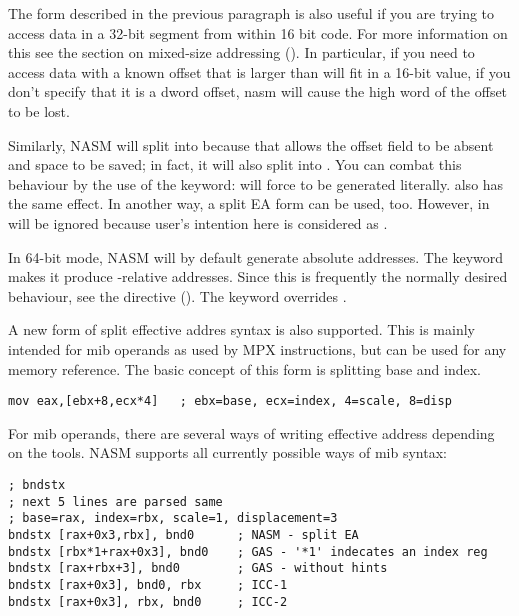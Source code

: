 The form described in the previous paragraph is also useful if you
are trying to access data in a 32-bit segment from within 16 bit code.
For more information on this see the section on mixed-size addressing
(). In particular, if you need to access data with
a known offset that is larger than will fit in a 16-bit value, if you don't
specify that it is a dword offset, nasm will cause the high word of
the offset to be lost.

Similarly, NASM will split \code{[eax*2]} into  because
that allows the offset field to be absent and space to be saved; in fact,
it will also split  into .
You can combat this behaviour by the use of the  keyword:
 will force \code{[eax*2+0]} to be generated literally.
 also has the same effect. In another way, a split EA
form \code{[0, eax*2]} can be used, too. However,  in
 will be ignored because user's intention here
is considered as .

In 64-bit mode, NASM will by default generate absolute addresses. The
 keyword makes it produce -relative addresses.
Since this is frequently the normally desired behaviour, see the 
directive (). The keyword  overrides
.

A new form of split effective addres syntax is also supported. This is
mainly intended for mib operands as used by MPX instructions, but can
be used for any memory reference. The basic concept of this form is
splitting base and index.

\begin{lstlisting}
mov eax,[ebx+8,ecx*4]   ; ebx=base, ecx=index, 4=scale, 8=disp
\end{lstlisting}

For mib operands, there are several ways of writing effective address
depending on the tools. NASM supports all currently possible ways of
mib syntax:

\begin{lstlisting}
; bndstx
; next 5 lines are parsed same
; base=rax, index=rbx, scale=1, displacement=3
bndstx [rax+0x3,rbx], bnd0      ; NASM - split EA
bndstx [rbx*1+rax+0x3], bnd0    ; GAS - '*1' indecates an index reg
bndstx [rax+rbx+3], bnd0        ; GAS - without hints
bndstx [rax+0x3], bnd0, rbx     ; ICC-1
bndstx [rax+0x3], rbx, bnd0     ; ICC-2
\end{lstlisting}

